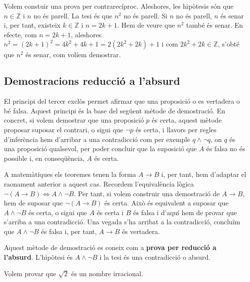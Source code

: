 \begin{solucio}
Volem constuir una prova per contrarecíproc. Aleshores, les hipòtesis són que $n\in\mathbb{Z}$ i $n$ no és parell. La tesi és
que $n^{2}$ no és parell. Si $n$ no és parell, $n$ és senar i,
per tant, existeix $k\in\mathbb{Z}$ i $n=2k+1$. Hem de veure que $n^{2}$ també és senar. En efecte, com $n=2k+1$, aleshores $n^{2}=\left(
2k+1\right) ^{2}=4k^{2}+4k+1=2\left( 2k^{2}+2k\right) +1$ i com $2k^{2}+2k\in\mathbb{Z}$, s'obté que $n^{2}$ és senar, com volíem demostrar.
\end{solucio}

\subsection{Demostracions reducció a l'absurd}

El principi del tercer exclòs permet afirmar que una proposició o es
vertadera o bé falsa. Aquest principi és la base del següent mètode de demostració. En concret, si volem demostrar que una
proposició $p$ és certa, aquest mètode proposar suposar el
contrari, o sigui que $\lnot p$ és certa, i llavors per regles d'inferència hem d'arribar a una contradicció com per exemple $q\wedge\lnot
q$, on $q$ és una proposició qualsevol, per poder concluir que la
suposició que $A$ és falsa no és possible i, en conseqüència, $A$ és certa.

A matemàtiques els teoremes tenen la forma $A\longrightarrow B$ i, per
tant, hem d'adaptar el raonament anterior a aquest cas. Recordem l'equivalència lògica $\lnot\left( A\longrightarrow B\right)
\Longleftrightarrow A\wedge\lnot B$. Per tant, si volem construir una
demostració de $A\longrightarrow B$, hem de suposar que $\lnot\left(
A\longrightarrow B\right) $ és certa. Això és equivalent a
suposar que $A\wedge\lnot B$ és certa, o sigui que $A$ és certa i $B$
és falsa i d'aquí hem de provar que s'arriba a una contradicció. Una vegada s'ha arribat a la contradicció, concluïm que $A\wedge\lnot B$ és falsa i, per tant, $A\longrightarrow B$ és
vertadera.

Aquest mètode de demostració es coneix com a \textbf{prova per
reducció a l'absurd}. L'hipòtesi és $A\wedge\lnot B$ i la tesi
és una contradicció o absurd.

\begin{exemple}
Volem provar que $\sqrt{2}$ és un nombre irracional.
\end{exemple}

